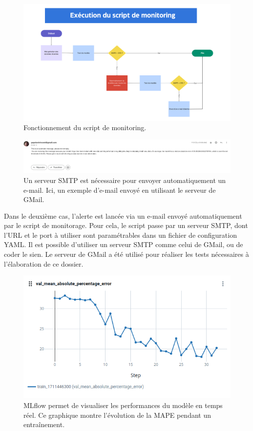 \documentclass[french]{article}
\begin{document}
    \begin{figure}[h!]
        \includegraphics[width=15cm]{monitoring}
        \centering
        \caption{Fonctionnement du script de monitoring.}
    \end{figure}

    \begin{figure}[h!]
        \includegraphics[width=12cm]{mail}
        \centering
        \caption{Un serveur SMTP est nécessaire pour envoyer automatiquement un e-mail. Ici, un exemple d'e-mail envoyé en utilisant le serveur de GMail.}
    \end{figure}

    Dans le deuxième cas, l'alerte est lancée via un e-mail envoyé automatiquement par le script de monitorage. Pour cela, le script passe par un serveur SMTP, dont l'URL et le port à utiliser sont paramétrables dans un fichier de configuration YAML. Il est possible d'utiliser un serveur SMTP comme celui de GMail, ou de coder le sien. Le serveur de GMail a été utilisé pour réaliser les tests nécessaires à l'élaboration de ce dossier.

    \begin{figure}[h!]
        \includegraphics[width=12cm]{mlflow}
        \centering
        \caption{MLflow permet de visualiser les performances du modèle en temps réel. Ce graphique montre l'évolution de la MAPE pendant un entraînement.}
    \end{figure}
\end{document}
